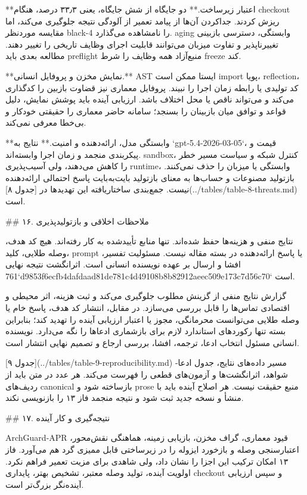 \documentclass[11pt,a4paper]{article}
\begin{document}
**اعتبار زیرساخت.** دو جایگاه از شش جایگاه، یعنی ۳۳٫۳ درصد، هنگام checkout ریزش کردند. جداکردن آن‌ها
از پیامد تعمیر از آلودگی نتیجه جلوگیری می‌کند، اما مقایسه موردنظر black-4 را نامشاهده می‌گذارد. aging
وابستگی، دسترسی بازبینی تغییرناپذیر و تفاوت میزبان می‌توانند قابلیت اجرای وظایف تاریخی را تغییر دهند.
مطالعه بعدی باید preflight منبع‌آزاد همه وظایف را شرط freeze کند.

**نمایش مخزن و پروفایل انسانی.** AST ایستا ممکن است import پویا، reflection، کد تولیدی یا رابطه زمان
اجرا را نبیند. پروفایل معماری نیز قضاوت بازبین را کدگذاری می‌کند و می‌تواند ناقص یا محل اختلاف باشد.
ارزیابی آینده باید پوشش نمایش، دلیل قواعد و توافق میان بازبینان را بسنجد؛ سامانه حاضر معماری را حقیقتی
خودکار و بی‌خطا معرفی نمی‌کند.

**وابستگی مدل، ارائه‌دهنده و امنیت.** نتایج به `gpt-5.4-2026-03-05`، قیمت و پیکربندی منجمد و زمان
اجرا وابسته‌اند. sandbox، کنترل شبکه و سیاست مسیر خطر را کاهش می‌دهند، ولی آسیب‌پذیری runtime، وابستگی
یا میزبان را حذف نمی‌کنند. بازتولید مصنوعات و حساب‌ها به معنای بازتولید بایت‌به‌بایت پاسخ احتمالی
ارائه‌دهنده نیست. جمع‌بندی ساختاریافته این تهدیدها در [جدول ۸](../tables/table-8-threats.md) است.

\#\# ۱۶. ملاحظات اخلاقی و بازتولیدپذیری

نتایج منفی و هزینه‌ها حفظ شده‌اند. تنها منابع تأییدشده به کار رفته‌اند. هیچ کد هدف، وصله طلایی، کلید،
prompt یا پاسخ ارائه‌دهنده در بسته مقاله نیست. مسئولیت تفسیر، افشا و ارسال بر عهده نویسنده انسانی
است. اثرانگشت نتیجه نهایی `761d9853f6ecfb4dafdaad81de781c4d49108b8b82912aeec509e173c7d56c70`
است.

گزارش نتایج منفی از گزینش مطلوب جلوگیری می‌کند و ثبت هزینه، اثر محیطی و اقتصادی تماس‌ها را قابل
بررسی می‌سازد. در مقابل، انتشار کد هدف، پاسخ خام یا وصله طلایی می‌توانست محرمانگی، مجوز یا اعتبار
ارزیابی آینده را تهدید کند؛ بنابراین بسته تنها رکوردهای استاندارد لازم برای بازشماری ادعاها را نگه
می‌دارد. نویسنده انسانی مسئول انتخاب ادعا، ترجمه، افشا، بررسی ارجاع و تصمیم نهایی انتشار است.

[جدول ۹](../tables/table-9-reproducibility.md) مسیر داده‌های نتایج، جدول ادعا-شواهد، اثرانگشت‌ها و
آزمون‌های قطعی را فهرست می‌کند. هر عدد در متن باید از ردیف‌های canonical بازساخته شود و prose منبع
حقیقت نیست. هر اصلاح آینده باید با منشأ و نسخه جدید ثبت شود و نتیجه منجمد فاز ۱۳ را بازنویسی نکند.

\#\# ۱۷. نتیجه‌گیری و کار آینده

ArchGuard-APR قیود معماری، گراف مخزن، بازیابی زمینه، هماهنگی نقش‌محور، اعتبارسنجی وصله و بازخورد
ایزوله را در زیرساختی قابل ممیزی گرد هم می‌آورد. فاز ۱۳ امکان ترکیب این اجزا را نشان داد، ولی شاهدی
برای مزیت تعمیر فراهم نکرد. اولویت آینده، تولید وصله معتبر، تشخیص بهتر، پایداری checkout و سپس ارزیابی
آینده‌نگر بزرگ‌تر است.
\end{document}
